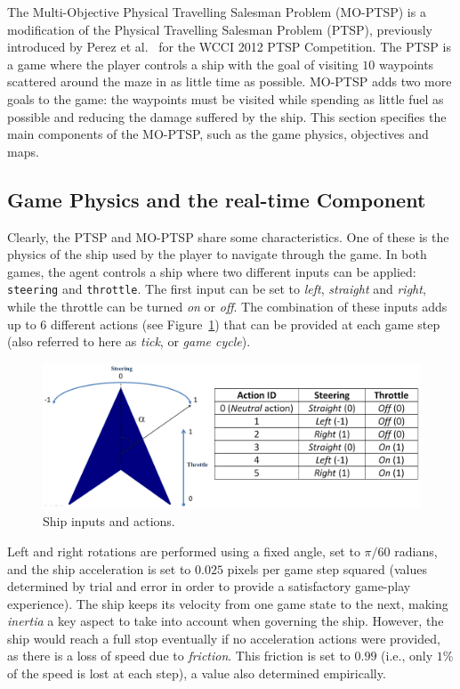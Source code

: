\documentclass[conference]{IEEEtran}
\begin{document}
The Multi-Objective Physical Travelling Salesman Problem (MO-PTSP) is a modification of the Physical Travelling Salesman Problem (PTSP), previously introduced by Perez et al.~\cite{PerezCEC2012} for the WCCI 2012 PTSP Competition. The PTSP is a game where the player controls a ship with the goal of visiting $10$ waypoints scattered around the maze in as little time as possible. MO-PTSP adds two more goals to the game: the waypoints must be visited while spending as little fuel as possible and reducing the damage suffered by the ship. This section specifies the main components of the MO-PTSP, such as the game physics, objectives and maps. 

\subsection{Game Physics and the real-time Component}

Clearly, the PTSP and MO-PTSP share some characteristics. One of these is the physics of the ship used by the player to navigate through the game. In both games, the agent controls a ship where two different inputs can be applied: \texttt{steering} and \texttt{throttle}. The first input can be set to \textit{left}, \textit{straight} and \textit{right}, while the throttle can be turned \textit{on} or \textit{off}. The combination of these inputs adds up to $6$ different actions (see Figure~\ref{fig:ship}) that can be provided at each game step (also referred to here as \textit{tick}, or \textit{game cycle}). 

\begin{figure} [!h]
	\begin{center}
	\includegraphics[width=0.8\columnwidth]{img/ShipActions}
	\caption{Ship inputs and actions.}
	\label{fig:ship}
	\end{center}
\end{figure}

Left and right rotations are performed using a fixed angle, set to $\pi/60$ radians, and the ship acceleration is set to $0.025$ pixels per game step squared (values determined by trial and error in order to provide a satisfactory game-play experience). The ship keeps its velocity from one game state to the next, making \textit{inertia} a key aspect to take into account when governing the ship. However, the ship would reach a full stop eventually if no acceleration actions were provided, as there is a loss of speed due to \textit{friction}. This friction is  set to $0.99$ (i.e., only $1\%$ of the speed is lost at each step), a value also determined empirically. 
\end{document}
